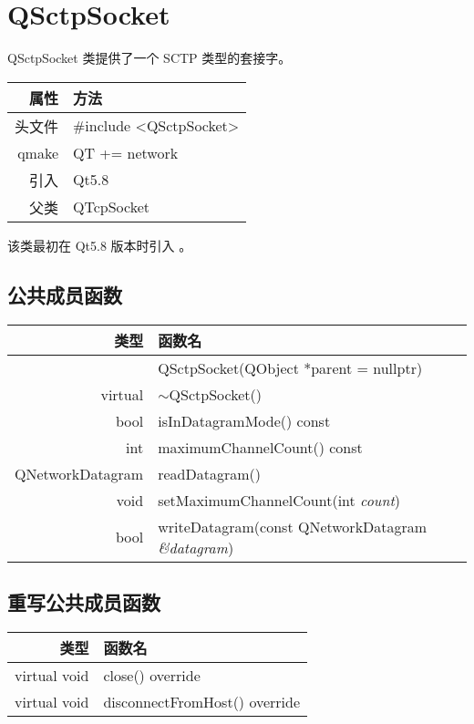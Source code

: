 \chapter{QSctpSocket}

QSctpSocket 类提供了一个 SCTP 类型的套接字。

\begin{tabular}{|r|l|}
	\hline
	属性 & 方法 \\
	\hline
	头文件 & \#include <QSctpSocket>\\      
	\hline
	qmake & QT += network\\      
	\hline
	引入 &	Qt5.8 \\ 
	\hline
	父类	 & QTcpSocket \\ 
	\hline
\end{tabular}

该类最初在 Qt5.8 版本时引入 。

\section{公共成员函数}

\begin{tabular}{|r|l|}
	\hline 
	类型	& 函数名 \\ 
	\hline
	& QSctpSocket(QObject *parent = nullptr) \\ 
	\hline
	virtual	& $\sim$QSctpSocket() \\ 
	\hline
	bool	& isInDatagramMode() const \\ 
	\hline
	int	& maximumChannelCount() const \\ 
	\hline
	QNetworkDatagram &	readDatagram() \\ 
	\hline
	void	& setMaximumChannelCount(int \emph{count}) \\ 
	\hline
	bool &	writeDatagram(const QNetworkDatagram \emph{\&datagram}) \\ 
	\hline
\end{tabular}


\section{重写公共成员函数}

\begin{tabular}{|r|l|}
	\hline 
	类型	& 函数名 \\ 
	\hline
	virtual void	& close() override \\ 
	\hline
    virtual void	& disconnectFromHost() override \\ 
	\hline
\end{tabular}


